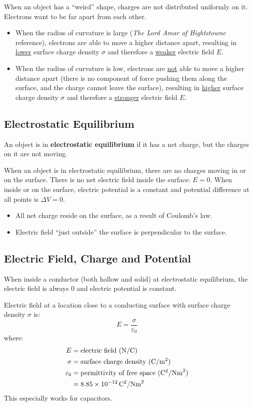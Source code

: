 \documentclass{article}
\newcommand{\definition}[1]{\begin{tcolorbox}[colback=red!5!white,colframe=red!75!black,parbox=false] #1 \end{tcolorbox}}
\newcommand{\theorem}[2]{\begin{tcolorbox}[title={#1},colback=blue!5!white,colframe=blue!75!black,parbox=false] #2 \end{tcolorbox}}
\begin{document}
When an object has a ``weird'' shape, charges are not distributed uniformly on it. Electrons want to be far apart from each other.
\begin{itemize}
	\item When the radius of curvature is large (\textit{The Lord Amar of Hightstowne} reference), electrons are able to move a higher distance apart, resulting in \ul{lower} surface charge density $\sigma$ and therefore a \ul{weaker} electric field $E$.
	\item When the radius of curvature is low, electrons are \ul{not} able to move a higher distance apart (there is no component of force pushing them along the surface, and the charge cannot leave the surface), resulting in \ul{higher} surface charge density $\sigma$ and therefore a \ul{stronger} electric field $E$.
\end{itemize}

\subsection{Electrostatic Equilibrium}

\definition{
	An object is in \textbf{electrostatic equilibrium} if it has a net charge, but the charges on it are not moving.
}
When an object is in electrostatic equilibrium, there are no charges moving in or on the surface. There is no net electric field inside the surface: $E=0$. When inside or on the surface, electric potential is a constant and potential difference at all points is $\Delta V=0$.

\theorem{Net charge}{
	\begin{itemize}
		\item All net charge reside on the surface, as a result of Coulomb's law.
		\item Electric field ``just outside'' the surface is perpendicular to the surface.
	\end{itemize}
}

\subsection{Electric Field, Charge and Potential}

\theorem{Inside a conductor}{
	When inside a conductor (both hollow and solid) at electrostatic equilibrium, the electric field is always 0 and electric potential is constant.
}
\theorem{Electric field close to conducting surface}{
	Electric field at a location close to a conducting surface with surface charge density $\sigma$ is:
	\begin{equation*}
	    E=\frac{\sigma}{\varepsilon_0}
	\end{equation*}
	where:
	\begin{align*}
		E&=\text{electric field (\si{N/C})} \\
		\sigma&=\text{surface charge density (\si{C/m^2})} \\
		\varepsilon_0&=\text{permittivity of free space (\si{\coulomb^2/\newton\meter^2})} \\
		&=8.85\times 10^{-12}\,\si{\coulomb^2/\newton\meter^2}
	\end{align*}
	This especially works for capacitors.
}
\end{document}
